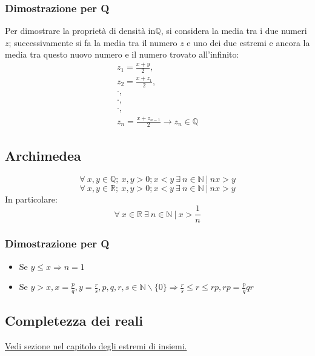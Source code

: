 \subsubsection*{Dimostrazione per Q}
Per dimostrare la propriet\`a di densit\`a in$\mathbb{Q}$, si considera la media tra i due numeri $z$; successivamente si fa la media tra il numero $z$ e uno dei due estremi
e ancora la media tra questo nuovo numero e il numero trovato all'infinito:
\begin{gather*}
z_1=\frac{x+y}{2},\\
z_2=\frac{x+z_1}{2},\\
\cdot,\\
\cdot,\\
\cdot,\\
z_n=\frac{x+z_{n-1}}{2}\rightarrow z_n\in\mathbb{Q}
\end{gather*}

\subsection{Archimedea}
\begin{equation*}
\forall\ x,y \in \mathbb{Q};\ x,y > 0; x<y\ \exists\ n \in \mathbb{N}\ |\ nx>y
\end{equation*}
\begin{equation*}
\forall\ x,y \in \mathbb{R};\ x,y > 0; x<y\ \exists\ n \in \mathbb{N}\ |\ nx>y
\end{equation*}
In particolare:
\begin{equation*}
\forall\ x \in \mathbb{R}\ \exists\ n \in \mathbb{N}\ |\ x>\frac{1}{n}
\end{equation*}
\subsubsection*{Dimostrazione per Q}
\begin{itemize}
\item Se $y\le x\Rightarrow n=1$
\item Se $y>x, x=\frac{p}{q}, y=\frac{r}{s}, p,q,r,s\in\mathbb{N}\backslash\{0\}\Rightarrow \frac{r}{s}\le r\le rp, rp=\frac{p}{q}qr$
\end{itemize}

\subsection{Completezza dei reali}
\hyperref[sec: CompletezzaReali]{\color{cyan}Vedi sezione nel capitolo degli estremi di insiemi.}